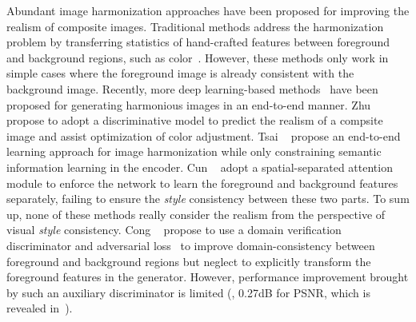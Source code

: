 \documentclass[final]{cvpr}
\begin{document}
Abundant image harmonization approaches have been proposed for improving the realism of composite images. Traditional methods address the harmonization problem by transferring statistics of hand-crafted features between foreground and background regions, such as color~\cite{pitie2007linear,reinhard2001color,xue2012understanding,sunkavalli2010multi}. However, these methods only work in simple cases where the foreground image is already consistent with the background image. Recently, more deep learning-based methods~\cite{cong2020dovenet,cun2020improving,tsai2017deep,zhu2015learning} have been proposed for generating harmonious images in an end-to-end manner. Zhu \etal~\cite{zhu2015learning} propose to adopt a discriminative model to predict the realism of a compsite image and assist optimization of color adjustment. Tsai \etal~\cite{tsai2017deep} propose an end-to-end learning approach for image harmonization while only constraining semantic information learning in the encoder. Cun \etal~\cite{cun2020improving} adopt a spatial-separated attention module to enforce the network to learn the foreground and background features separately, failing to ensure the \emph{style} consistency between these two parts. To sum up, none of these methods really consider the realism from the perspective of visual \emph{style} consistency. Cong \etal~\cite{cong2020dovenet} propose to use a domain verification discriminator and adversarial loss~\cite{goodfellow2014generative} to improve domain-consistency between foreground and background regions but neglect to explicitly transform the foreground features in the generator. However, performance improvement brought by such an auxiliary discriminator is limited (\ie, 0.27dB for PSNR, which is revealed in~\cite{cong2020dovenet}). 
\end{document}
